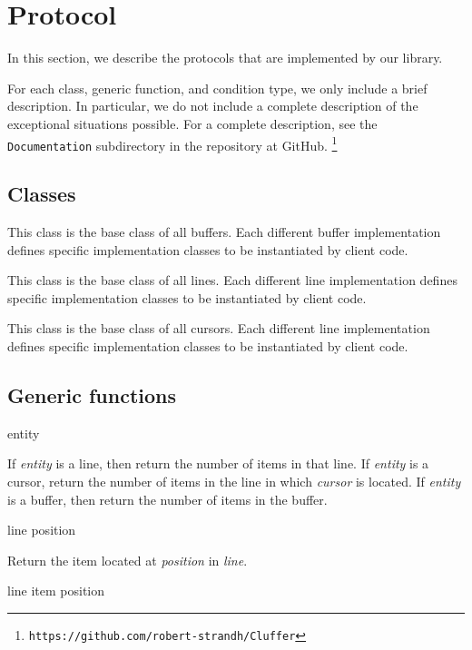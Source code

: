 \appendix

\section{Protocol}

In this section, we describe the protocols that are implemented by our
library.

For each class, generic function, and condition type, we only include
a brief description.  In particular, we do not include a complete
description of the exceptional situations possible.  For a complete
description, see the \texttt{Documentation} subdirectory in
the repository at GitHub.%
\footnote{\texttt{https://github.com/robert-strandh/Cluffer}}

\subsection{Classes}


This class is the base class of all buffers.  Each different buffer
implementation defines specific implementation classes to be
instantiated by client code.


This class is the base class of all lines.  Each different line
implementation defines specific implementation classes to be
instantiated by client code.


This class is the base class of all cursors.  Each different line
implementation defines specific implementation classes to be
instantiated by client code.

\subsection{Generic functions}

 {entity}

If \textit{entity} is a line, then return the number of items in that
line.  If \textit{entity} is a cursor, return the number of items in
the line in which \textit{cursor} is located.  If \textit{entity} is a
buffer, then return the number of items in the buffer.

 {line position}

Return the item located at \textit{position} in \textit{line}.

 {line item position}

